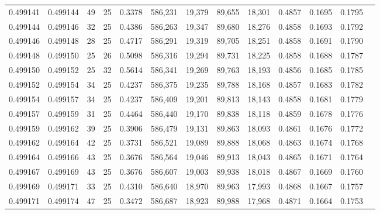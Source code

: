 \begin{tabular}{rrrrrrrrrrrrr}
0.499141 & 0.499144 &    49 &  25 &                                     0.3378 & 586,231 &  19,379 &  89,655 &  18,301 & 0.4857 & 0.1695 & 0.1795 \\
0.499144 & 0.499146 &    32 &  25 &                                     0.4386 & 586,263 &  19,347 &  89,680 &  18,276 & 0.4858 & 0.1693 & 0.1792 \\
0.499146 & 0.499148 &    28 &  25 &                                     0.4717 & 586,291 &  19,319 &  89,705 &  18,251 & 0.4858 & 0.1691 & 0.1790 \\
0.499148 & 0.499150 &    25 &  26 &                                     0.5098 & 586,316 &  19,294 &  89,731 &  18,225 & 0.4858 & 0.1688 & 0.1787 \\
0.499150 & 0.499152 &    25 &  32 &                                     0.5614 & 586,341 &  19,269 &  89,763 &  18,193 & 0.4856 & 0.1685 & 0.1785 \\
0.499152 & 0.499154 &    34 &  25 &                                     0.4237 & 586,375 &  19,235 &  89,788 &  18,168 & 0.4857 & 0.1683 & 0.1782 \\
0.499154 & 0.499157 &    34 &  25 &                                     0.4237 & 586,409 &  19,201 &  89,813 &  18,143 & 0.4858 & 0.1681 & 0.1779 \\
0.499157 & 0.499159 &    31 &  25 &                                     0.4464 & 586,440 &  19,170 &  89,838 &  18,118 & 0.4859 & 0.1678 & 0.1776 \\
0.499159 & 0.499162 &    39 &  25 &                                     0.3906 & 586,479 &  19,131 &  89,863 &  18,093 & 0.4861 & 0.1676 & 0.1772 \\
0.499162 & 0.499164 &    42 &  25 &                                     0.3731 & 586,521 &  19,089 &  89,888 &  18,068 & 0.4863 & 0.1674 & 0.1768 \\
0.499164 & 0.499166 &    43 &  25 &                                     0.3676 & 586,564 &  19,046 &  89,913 &  18,043 & 0.4865 & 0.1671 & 0.1764 \\
0.499167 & 0.499169 &    43 &  25 &                                     0.3676 & 586,607 &  19,003 &  89,938 &  18,018 & 0.4867 & 0.1669 & 0.1760 \\
0.499169 & 0.499171 &    33 &  25 &                                     0.4310 & 586,640 &  18,970 &  89,963 &  17,993 & 0.4868 & 0.1667 & 0.1757 \\
0.499171 & 0.499174 &    47 &  25 &                                     0.3472 & 586,687 &  18,923 &  89,988 &  17,968 & 0.4871 & 0.1664 & 0.1753 \\

\end{tabular}
